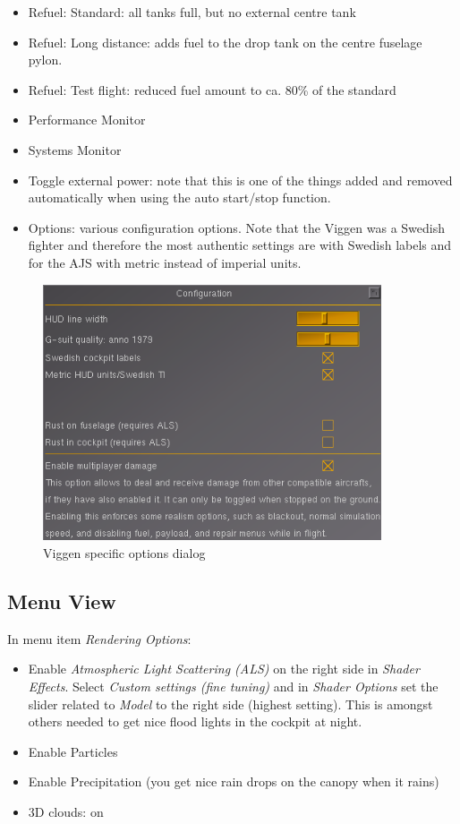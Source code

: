 \begin{itemize}
\item Refuel: Standard: all tanks full, but no external centre tank
\item Refuel: Long distance: adds fuel to the drop tank on the centre fuselage pylon.
\item Refuel: Test flight: reduced fuel amount to ca. 80\% of the standard
\item Performance Monitor
\item Systems Monitor
\item Toggle external power: note that this is one of the things added and removed automatically when using the auto start/stop function.
\item Options: various configuration options. Note that the Viggen was a Swedish fighter and therefore the most authentic settings are with Swedish labels and for the AJS with metric instead of imperial units.
\end{itemize}

\begin{figure}[h]
\centering
 \includegraphics[width=10cm]{images/fg_option_config.png}
 \caption{Viggen specific options dialog}
\end{figure}

\subsection{Menu View}
In menu item \emph{Rendering Options}:
\begin{itemize}
\item Enable \emph{Atmospheric Light Scattering (ALS)} on the right side in \emph{Shader Effects}. Select \emph{Custom settings (fine tuning)} and in \emph{Shader Options} set the slider related to \emph{Model} to the right side (highest setting). This is amongst others needed to get nice flood lights in the cockpit at night.
\item Enable Particles
\item Enable Precipitation (you get nice rain drops on the canopy when it rains)
\item 3D clouds: on
\end{itemize}

